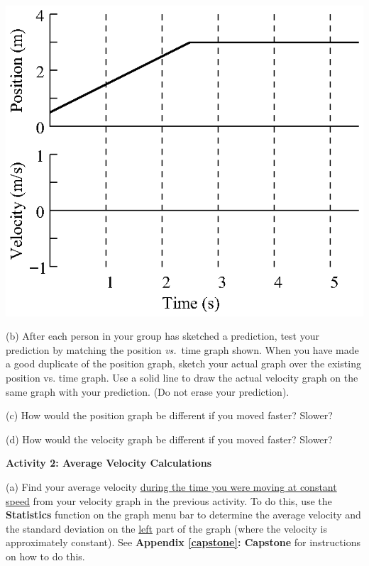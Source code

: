 \vspace{0.3cm}
{\par\centering \includegraphics{relating/relating_fig1.eps} \par}
\vspace{0.3cm}

(b) After each person in your group has sketched a prediction, test your prediction
by matching the position \textit{vs.}~time graph shown. When you have made a good duplicate
of the position graph, sketch your actual graph over the existing position vs. time graph.
Use a solid line to draw the actual velocity graph on the same graph with
your prediction. (Do not erase your prediction).

(c) How would the position graph be different if you moved faster? Slower? 
\answerspace{15mm}

(d) How would the velocity graph be different if you moved faster? Slower? 
\answerspace{15mm}

\textbf{Activity 2: Average Velocity Calculations} 

(a) Find your average velocity \underline{during the time you were moving at constant speed} from your velocity graph in the previous activity. To do this, use the \textbf{Statistics} function on the graph menu bar to determine the average velocity and the standard deviation on the \underline{left} part of the graph (where the velocity is approximately constant). See \textbf{Appendix \ref{capstone}: Capstone} for instructions on how to do this.

